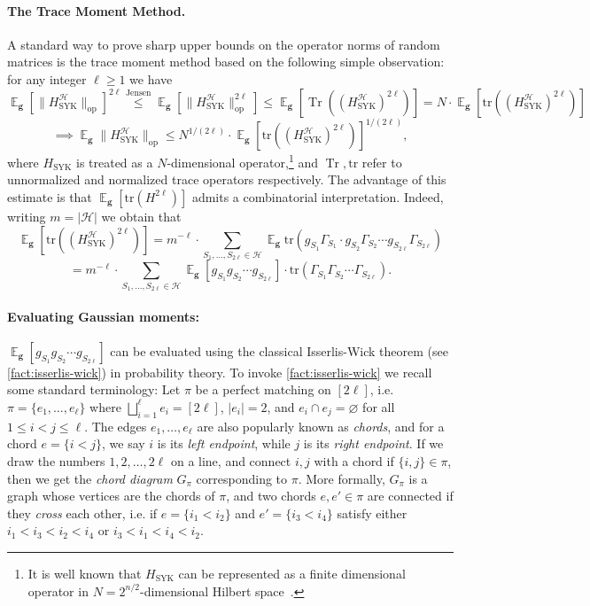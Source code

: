 \documentclass
[11pt,letterpaper]
{article}
\theoremstyle{definition}
\newcommand{\Tr}{\operatorname{Tr}}
\newcommand{\1}{\mathbf{1}}
\newcommand{\tr}{\mathrm{tr}}
\newcommand{\cH}{\mathcal H}
\DeclareMathOperator*{\E}{\mathbb{E}}
\renewcommand{\emptyset}{\varnothing}
\renewcommand{\geq}{\geqslant}
\renewcommand{\leq}{\leqslant}
\newcommand{\syk}{\operatorname{SYK}}
\begin{document}
\paragraph{The Trace Moment Method.} A standard way to prove sharp upper bounds on the operator norms of random matrices is the trace moment method based on the following simple observation: for any integer $\ell\geq 1$ we have 
\[\E_{\bm g}\left[\|H^\cH_{\operatorname{SYK}}\|_{\operatorname{op}}\right]^{2\ell}\overset{\text{Jensen}}{\leq}\E_{\bm g}\left[\|H^\cH_{\operatorname{SYK}}\|_{\operatorname{op}}^{2\ell}\right]\leq\E_{\bm g}\left[\Tr((H^\cH_{\operatorname{SYK}})^{2\ell})\right] = N\cdot\E_{\bm g}\left[\tr((H^\cH_{\operatorname{SYK}})^{2\ell})\right]\] 
\[\implies\E_{\bm g}\|H^\cH_{\operatorname{SYK}}\|_{\operatorname{op}}\leq N^{1/(2\ell)}\cdot\E_{\bm g}\left[\tr((H^\cH_{\operatorname{SYK}})^{2\ell})\right]^{1/(2\ell)},\]
where $H_{\syk}$ is treated as a $N$-dimensional operator,\footnote{It is well known that $H_{\syk}$ can be represented as a finite dimensional operator in $N = 2^{n/2}$-dimensional Hilbert space~\cite{BravyiK02}.} and $\Tr, \tr$ refer to unnormalized and normalized trace operators respectively. The advantage of this estimate is that $\E_{\bm g}\left[\tr(H^{2\ell})\right]$ admits a combinatorial interpretation. Indeed, writing $m = |\cH|$ we obtain that 
\[\E_{\bm g}\left[\tr((H^\cH_{\operatorname{SYK}})^{2\ell})\right] = m^{-\ell}\cdot\sum_{S_1, \ldots, S_{2\ell}\in\cH}\E_{\bm g}\tr\left(g_{S_1}\Gamma_{S_1}\cdot g_{S_2}\Gamma_{S_2}\cdots g_{S_{2\ell}}\Gamma_{S_{2\ell}}\right)\]
\[ = m^{-\ell}\cdot\sum_{S_1, \ldots, S_{2\ell}\in\cH}\E_{\bm g}\left[g_{S_1}g_{S_2}\cdots g_{S_{2\ell}}\right]\cdot\tr\left(\Gamma_{S_1}\Gamma_{S_2}\cdots\Gamma_{S_{2\ell}}\right).\]
\paragraph{Evaluating Gaussian moments:} $\E_{\bm g}\left[g_{S_1}g_{S_2}\cdots g_{S_{2\ell}}\right]$ can be evaluated using the classical Isserlis-Wick theorem (see \cref{fact:isserlis-wick}) in probability theory. To invoke \cref{fact:isserlis-wick} we recall some standard terminology: Let $\pi$ be a perfect matching on $[2\ell]$, i.e. $\pi = \{e_1, \ldots, e_\ell\}$ where $\bigsqcup_{i = 1}^\ell e_i = [2\ell]$, $|e_i| = 2$, and $e_i\cap e_j = \emptyset$ for all $1\leq i < j\leq\ell$. The edges $e_1, \ldots, e_\ell$ are also popularly known as \emph{chords}, and for a chord $e = \{i < j\}$, we say $i$ is its \emph{left endpoint}, while $j$ is its \emph{right endpoint}. If we draw the numbers $1, 2, \ldots, 2\ell$ on a line, and connect $i, j$ with a chord if $\{i, j\}\in\pi$, then we get the \emph{chord diagram} $G_\pi$ corresponding to $\pi$. More formally, $G_\pi$ is a graph whose vertices are the chords of $\pi$, and two chords $e, e'\in\pi$ are connected if they \emph{cross} each other, i.e. if $e = \{i_1 < i_2\}$ and $e' = \{i_3 < i_4\}$ satisfy either $i_1 < i_3 < i_2 < i_4$ or $i_3 < i_1 < i_4 < i_2$. 
\end{document}
